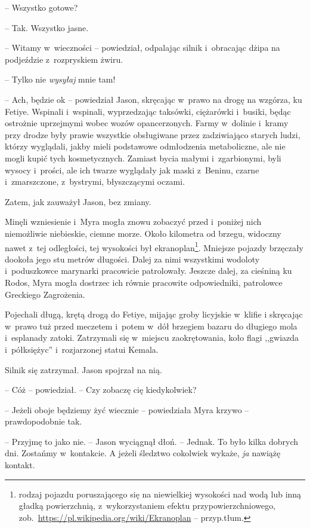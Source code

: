 \documentclass[oneside,polish,11pt,sfheadings]{mwbk}
\begin{document}
-- Wszystko gotowe?

-- Tak. Wszystko jasne.

-- Witamy w~wieczności -- powiedział, odpalając silnik i~obracając dżipa
na podjeździe z~rozpryskiem żwiru.

-- Tylko nie \textit{wysyłaj} mnie tam!

-- Ach, będzie ok -- powiedział Jason, skręcając w~prawo na drogę na
wzgórza, ku Fetiye. Wspinali i~wspinali, wyprzedzając taksówki,
ciężarówki i~busiki, będąc ostrożnie uprzejmymi wobec wozów
opancerzonych. Farmy w~dolinie i~kramy przy drodze były prawie wszystkie
obsługiwane przez zadziwiająco starych ludzi, którzy wyglądali, jakby
mieli podstawowe odmłodzenia metaboliczne, ale nie mogli kupić tych
kosmetycznych. Zamiast bycia małymi i~zgarbionymi, byli wysocy i~prości,
ale ich twarze wyglądały jak maski z~Beninu, czarne i~zmarszczone, z~bystrymi, błyszczącymi oczami.

Zatem, jak zauważył Jason, bez zmiany.

Minęli wzniesienie i~Myra mogła znowu zobaczyć przed i~poniżej nich
niemożliwie niebieskie, ciemne morze. Około kilometra od brzegu,
widoczny nawet z~tej odległości, tej wysokości był ekranoplan\footnote{ rodzaj
pojazdu poruszającego się na niewielkiej wysokości nad wodą lub inną
gładką powierzchnią, z~wykorzystaniem efektu przypowierzchniowego,
zob.~\url{https://pl.wikipedia.org/wiki/Ekranoplan} -- przyp.tłum.}. Mniejsze pojazdy brzęczały dookoła jego stu metrów
długości. Dalej za nimi wszystkimi wodoloty i~poduszkowce marynarki
pracowicie patrolowały. Jeszcze dalej, za cieśniną ku Rodos, Myra mogła
dostrzec ich równie pracowite odpowiedniki, patrolowce Greckiego
Zagrożenia.

Pojechali długą, krętą drogą do Fetiye, mijając groby licyjskie w~klifie
i skręcając w~prawo tuż przed meczetem i~potem w~dół brzegiem bazaru do
długiego mola i~esplanady zatoki. Zatrzymali się w~miejscu
zaokrętowania, koło flagi ,,gwiazda i~półksiężyc'' i~rozjarzonej statui
Kemala.

Silnik się zatrzymał. Jason spojrzał na nią.

-- Cóż -- powiedział. -- Czy zobaczę cię kiedykolwiek?

-- Jeżeli oboje będziemy żyć wiecznie -- powiedziała Myra krzywo -- prawdopodobnie tak.

-- Przyjmę to jako nie. -- Jason wyciągnął dłoń. -- Jednak. To było kilka
dobrych dni. Zostańmy w~kontakcie. A jeżeli śledztwo cokolwiek wykaże,
\textit{ja} nawiążę kontakt.
\end{document}
